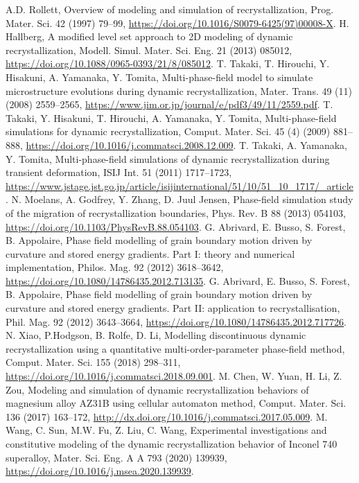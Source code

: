 \documentclass[a4paper, 11pt, dvipsnames]{article}
\begin{document}
\begin{thebibliography}{99}
 A.D. Rollett, {Overview of modeling and simulation of recrystallization}, Prog. Mater. Sci. 42 (1997) 79--99, \url{https://doi.org/10.1016/S0079-6425(97)00008-X}.
 H. Hallberg, {A modified level set approach to 2D modeling of dynamic recrystallization}, Modell. Simul. Mater. Sci. Eng. 21 (2013) 085012, \url{https://doi.org/10.1088/0965-0393/21/8/085012}.
 T. Takaki, T. Hirouchi, Y. Hisakuni, A. Yamanaka, Y. Tomita, {Multi-phase-field model to simulate microstructure evolutions during dynamic recrystallization}, Mater. Trans. 49 (11) (2008) 2559--2565, \url{https://www.jim.or.jp/journal/e/pdf3/49/11/2559.pdf}.
 T. Takaki, Y. Hisakuni, T. Hirouchi, A. Yamanaka, Y. Tomita, {Multi-phase-field simulations for dynamic recrystallization}, Comput. Mater. Sci. 45 (4) (2009) 881--888, \url{https://doi.org/10.1016/j.commatsci.2008.12.009}.
T. Takaki, A. Yamanaka, Y. Tomita, Multi-phase-field simulations of dynamic recrystallization during transient deformation, ISIJ Int. 51 (2011) 1717--1723, \url{https://www.jstage.jst.go.jp/article/isijinternational/51/10/51_10_1717/_article}.
 N. Moelans, A. Godfrey, Y. Zhang, D. Juul Jensen, {Phase-field simulation study of the migration of recrystallization boundaries}, Phys. Rev. B 88  (2013) 054103, \url{https://doi.org/10.1103/PhysRevB.88.054103}.
 G. Abrivard, E. Busso, S. Forest, B. Appolaire, Phase field modelling of grain boundary motion driven by curvature and stored energy gradients. Part I: theory and numerical implementation, Philos. Mag. 92 (2012) 3618--3642, \url{https://doi.org/10.1080/14786435.2012.713135}.
 G. Abrivard, E. Busso, S. Forest, B. Appolaire, {Phase field modelling of grain boundary motion driven by curvature and stored energy gradients. Part II: application to recrystallisation}, Phil. Mag. 92 (2012) 3643--3664, \url{https://doi.org/10.1080/14786435.2012.717726}.
 N. Xiao, P.Hodgson, B. Rolfe, D. Li, {Modelling discontinuous dynamic recrystallization using a quantitative multi-order-parameter phase-field method},  Comput. Mater. Sci. 155 (2018) 298--311, \url{https://doi.org/10.1016/j.commatsci.2018.09.001}.
 M. Chen, W. Yuan, H. Li, Z. Zou, {Modeling and simulation of dynamic recrystallization behaviors of magnesium alloy AZ31B using cellular automaton method},  Comput. Mater. Sci. 136 (2017) 163--172, \url{http://dx.doi.org/10.1016/j.commatsci.2017.05.009}.
 M. Wang, C. Sun, M.W. Fu, Z. Liu, C. Wang, {Experimental investigations and constitutive modeling of the dynamic recrystallization behavior of Inconel 740 superalloy}, Mater. Sci. Eng. A A 793 (2020) 139939, \url{https://doi.org/10.1016/j.msea.2020.139939}. 

\end{thebibliography}
\end{document}
